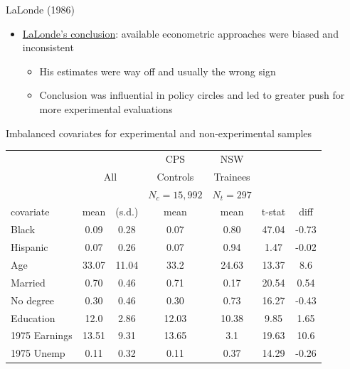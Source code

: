 \documentclass{beamer}
\begin{document}
\begin{frame}{LaLonde (1986)}

\begin{itemize}

	\item \underline{LaLonde's conclusion}: available econometric approaches were biased and inconsistent
		\begin{itemize}
		\item His estimates were way off and usually the wrong sign
		\item Conclusion was influential in policy circles and led to greater push for more experimental evaluations
		\end{itemize}

\end{itemize}

\end{frame}


\begin{frame}[plain,shrink=10]{Imbalanced covariates for experimental and non-experimental samples}

    \begin{center}
		\begin{table}
		\begin{tabular}{lcccccc}
		\hline \hline
		\multicolumn{3}{c}{}&
		\multicolumn{1}{c}{CPS}&
		\multicolumn{1}{c}{NSW}\\
		
		\multicolumn{1}{c}{}&
		\multicolumn{2}{c}{All} &
		\multicolumn{1}{c}{Controls} &
		\multicolumn{1}{c}{Trainees} \\

		\multicolumn{3}{c}{}&
		\multicolumn{1}{c}{$N_c=15,992$}&
		\multicolumn{1}{c}{$N_t=297$}&
		\multicolumn{1}{c}{}&
		\multicolumn{1}{c}{}\\

		\multicolumn{1}{l}{covariate}&
		\multicolumn{1}{c}{mean}&
		\multicolumn{1}{c}{(s.d.)}&
		\multicolumn{1}{c}{mean}&
		\multicolumn{1}{c}{mean}&
		\multicolumn{1}{c}{t-stat}&
		\multicolumn{1}{c}{diff}\\
		\hline
Black    & 0.09 & 0.28 & 0.07 & 0.80 & 47.04 & -0.73\\
Hispanic & 0.07 & 0.26 & 0.07 & 0.94 & 1.47 & -0.02\\
Age & 33.07 & 11.04 & 33.2 & 24.63 & 13.37  & 8.6\\
Married & 0.70 & 0.46 & 0.71 & 0.17 & 20.54 & 0.54\\
No degree & 0.30 & 0.46 & 0.30 & 0.73 & 16.27 & -0.43\\
Education & 12.0 & 2.86 & 12.03 & 10.38 & 9.85 & 1.65 \\
1975 Earnings   & 13.51 & 9.31 & 13.65 & 3.1 & 19.63 & 10.6\\
1975 Unemp  & 0.11 & 0.32 & 0.11 & 0.37 & 14.29 & -0.26\\
		\hline 
		\end{tabular}
		\end{table}
    \end{center}

\end{frame}
\end{document}
